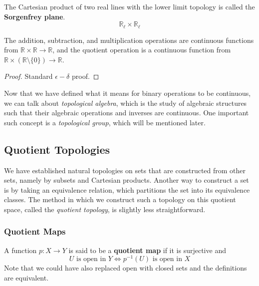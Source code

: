   \begin{example}
    The Cartesian product of two real lines with the lower limit topology is called the \textbf{Sorgenfrey plane}. 
    \begin{equation}
      \mathbb{R}_\ell \times \mathbb{R}_\ell
    \end{equation}
  \end{example}

  \begin{lemma}
    The addition, subtraction, and multiplication operations are continuous functions from $\mathbb{R} \times \mathbb{R} \longrightarrow \mathbb{R}$, and the quotient operation is a continuous function from $\mathbb{R} \times (\mathbb{R} \setminus \{0\}) \longrightarrow \mathbb{R}$. 
  \end{lemma}
  \begin{proof}
    Standard $\epsilon-\delta$ proof. 
  \end{proof}

  Now that we have defined what it means for binary operations to be continuous, we can talk about \textit{topological algebra}, which is the study of algebraic structures such that their algebraic operations and inverses are continuous. One important such concept is a \textit{topological group}, which will be mentioned later. 

\subsection{Quotient Topologies} 

  We have established natural topologies on sets that are constructed from other sets, namely by subsets and Cartesian products. Another way to construct a set is by taking an equivalence relation, which partitions the set into its equivalence classes. The method in which we construct such a topology on this quotient space, called the \textit{quotient topology}, is slightly less straightforward.  

\subsubsection{Quotient Maps}

  \begin{definition}
    A function $p: X \rightarrow Y$ is said to be a \textbf{quotient map} if it is surjective and 
    \begin{equation}
      U \text{ is open in } Y \iff p^{-1}(U) \text{ is open in } X
    \end{equation} 
    Note that we could have also replaced open with closed sets and the definitions are equivalent. 
  \end{definition}

